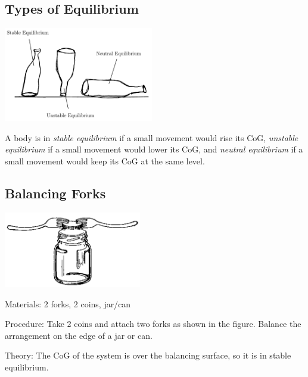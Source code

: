 \begin{multicols}{2}

\section*{Types of Equilibrium} 

\begin{center}
\includegraphics[width=0.49\textwidth]{./img/equilibrium.png}
\end{center}

A body is in \emph{stable equilibrium} if a small movement would rise its CoG, \emph{unstable equilibrium} if a small movement would lower its CoG, and \emph{neutral equilibrium} if a small movement would keep its CoG at the same level.

\subsection{Balancing Forks}

\begin{center}
\includegraphics[width=0.45\textwidth]{./img/source/forks.png}
\end{center}

\begin{description*}
\item[Materials:]{2 forks, 2 coins, jar/can}
\item[Procedure:]{Take 2 coins and attach two forks as shown in the figure. Balance the arrangement on the edge of a jar or can.}
\item[Theory:]{The CoG of the system is over the balancing surface, so it is in stable equilibrium.}
\end{description*}


\end{multicols}
